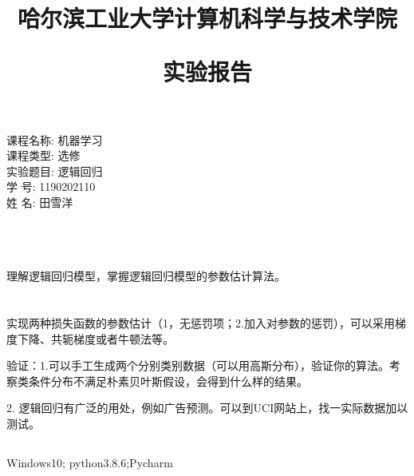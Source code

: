 \documentclass[lang=cn,a4paper,cite=authoryear]{elegantpaper}
\title{\zihao{1}哈尔滨工业大学计算机科学与技术学院 \par 实验报告}
\date{}
\begin{document}
\maketitle
\thispagestyle{empty}
\begin{center}
   	{ 课程名称:  机器学习}\\[.5cm]
    { 课程类型:   选修}\\[.5cm]
    { 实验题目:  逻辑回归}\\[.5cm]
	{ 学 号:  1190202110}\\[.5cm]
	{ 姓 名: 田雪洋}\\[.5cm]
    { \date{\zhtoday}}\\[.50cm]
\end{center}


\newpage
{}
\section*{}
理解逻辑回归模型，掌握逻辑回归模型的参数估计算法。

\section*{}
\subsection*{}
实现两种损失函数的参数估计（1，无惩罚项；2.加入对参数的惩罚），可以采用梯度下降、共轭梯度或者牛顿法等。

\par 验证：1.可以手工生成两个分别类别数据（可以用高斯分布），验证你的算法。考察类条件分布不满足朴素贝叶斯假设，会得到什么样的结果。
\par 2. 逻辑回归有广泛的用处，例如广告预测。可以到UCI网站上，找一实际数据加以测试。


\subsection*{}
Windows10; python3.8.6;Pycharm 
\end{document}
